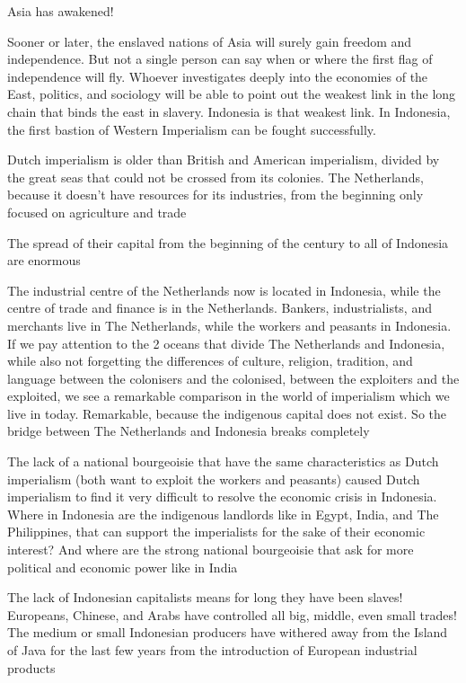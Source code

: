 Asia has awakened! \vskip 0.2in

Sooner or later, the enslaved nations of Asia will surely gain freedom and independence. 
But not a single person can say when or where the first flag of independence will fly. 
Whoever investigates deeply into the economies of the East, politics, and sociology will 
be able to point out the weakest link in the long chain that binds the east in slavery. Indonesia is that weakest link. 
In Indonesia, the first bastion of Western Imperialism can be fought successfully. \vskip 0.2in

Dutch imperialism is older than British and American imperialism, divided by the great seas that could not be crossed from its colonies. 
The Netherlands, because it doesn't have resources for its industries, from the beginning only focused on agriculture and trade\vskip 0.2in

The spread of their capital from the beginning of the century to all of Indonesia are enormous\vskip 0.2in

The industrial centre of the Netherlands now is located in Indonesia, while the centre of trade and finance is in the Netherlands. 
Bankers, industrialists, and merchants live in The Netherlands, while the workers and peasants in Indonesia. 
If we pay attention to the 2 oceans that divide The Netherlands and Indonesia, while also not forgetting the differences of 
culture, religion, tradition, and language between the colonisers and the colonised, between the exploiters and the exploited,
we see a remarkable comparison in the world of imperialism which we live in today. Remarkable, because the indigenous capital 
does not exist. So the bridge between The Netherlands and Indonesia breaks completely\vskip 0.2in

The lack of a national bourgeoisie that have the same characteristics as Dutch imperialism 
(both want to exploit the workers and peasants) caused Dutch imperialism to find it 
very difficult to resolve the economic crisis in Indonesia. Where in Indonesia are the 
indigenous landlords like in Egypt, India, and The Philippines, that can support the imperialists 
for the sake of their economic interest? And where are the strong national bourgeoisie that ask 
for more political and economic power like in India\vskip 0.2in

The lack of Indonesian capitalists means for long they have been slaves! 
Europeans, Chinese, and Arabs have controlled all big, middle, even small trades! The medium 
or small Indonesian producers have withered away from the Island of Java for the last few 
years from the introduction of European industrial products\vskip 0.2in

